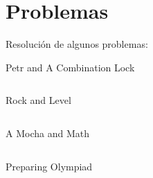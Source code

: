 \section{Problemas}

Resolución de algunos problemas:

\begin{center}
	\Large Petr and A Combination Lock
\end{center}

\inputminted{cpp}{../CodeForces/CPP/1097B_petr_and_a_combination_lock.cpp}

\begin{center}
	\Large Rock and Level
\end{center}

\inputminted{cpp}{../CodeForces/CPP/1402B_rock_and_lever.cpp}

\begin{center}
	\Large A Mocha and Math
\end{center}

\inputminted{cpp}{../CodeForces/CPP/1559A_mocha_and_math.cpp}

\begin{center}
	\Large Preparing Olympiad
\end{center}

\inputminted{cpp}{../CodeForces/CPP/550B_preparing_olympiad.cpp}


